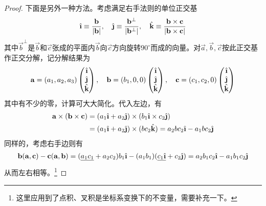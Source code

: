 \begin{proof}
  下面是另外一种方法。考虑满足右手法则的单位正交基
  \begin{align*}
    \ihat \equiv \frac{\vec b}{\left|\vec b\right|},\quad
    \jhat \equiv \frac{\vec b^\perp}{\left|\vec b^\perp\right|},\quad
    \khat \equiv \frac{\vec b\times \vec c}{\left|\vec b\times\vec c\right|}
  \end{align*}
  其中$\vec b^\perp$是$\vec b$和$\vec c$张成的平面内$\vec b$向$\vec c$方向旋转$90^\circ$而成的向量。对$\vec a,\vec b,\vec c$按此正交基作正交分解，记分解结果为
  \begin{align*}
    \vec a=(a_1, a_2, a_3)\begin{pmatrix}\ihat\\ \jhat\\ \khat\end{pmatrix}, \quad
    \vec b=(b_1,   0,   0)\begin{pmatrix}\ihat\\ \jhat\\ \khat\end{pmatrix}, \quad
    \vec c=(c_1, c_2,   0)\begin{pmatrix}\ihat\\ \jhat\\ \khat\end{pmatrix}
  \end{align*}
  其中有不少的零，计算可大大简化。代入左边，有
  \begin{align*}
    \vec a\times(\vec b\times\vec c) ={}& (a_1\ihat + a_2\jhat)\times(b_1\ihat \times c_2\jhat)\\
    ={}& (a_1\ihat + a_2\jhat)\times(bc_2\khat) = a_2bc_2\ihat - a_1bc_2\jhat
  \end{align*}
  同样的，考虑右手边则有
  \begin{align*}
    \vec b(\vec a,\vec c) - \vec c(\vec a,\vec b) = (\underline{a_1c_1} + a_2c_2) b_1\ihat  - (a_1b_1)(\underline{c_1\ihat} + c_2\jhat)
    =a_2b_1c_2\ihat - a_1b_1c_2\jhat
  \end{align*}
  从而左右相等。\footnote{这里应用到了点积、叉积是坐标系变换下的不变量，需要补充一下。}
\end{proof}

